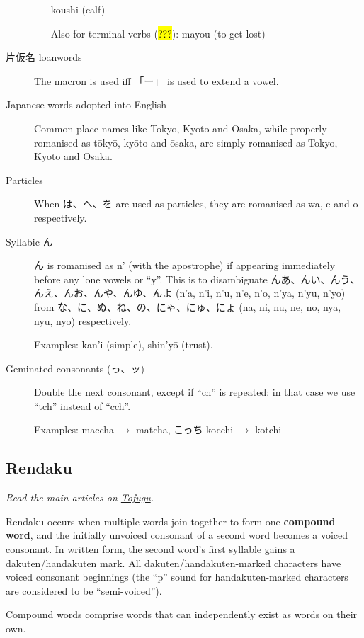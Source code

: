 \documentclass[../nihongo-gakushuu-kyouzai.tex]{subfiles}
\begin{document}
\begin{description}
\begin{itemize}
         koushi (calf)

        Also for terminal verbs (\hl{???}):  mayou (to get lost)
    \end{itemize}
    \item[片仮名 loanwords] The macron is used iff 「ー」 is used to extend a vowel.
    \item[Japanese words adopted into English] Common place names like Tokyo, Kyoto and Osaka, while properly romanised as t\=oky\=o, ky\=oto and \=osaka, are simply romanised as Tokyo, Kyoto and Osaka.
    \item[Particles] When は、へ、を are used as particles, they are romanised as wa, e and o respectively.
    \item[Syllabic ん] ん is romanised as n' (with the apostrophe) if appearing immediately before any lone vowels or ``y''. This is to disambiguate んあ、んい、んう、んえ、んお、んや、んゆ、んよ (n'a, n'i, n'u, n'e, n'o, n'ya, n'yu, n'yo) from な、に、ぬ、ね、の、にゃ、にゅ、にょ (na, ni, nu, ne, no, nya, nyu, nyo) respectively.

    Examples:  kan'i (simple),  shin'y\=o (trust).
    \item[Geminated consonants (っ、ッ)] Double the next consonant, except if ``ch'' is repeated: in that case we use ``tch'' instead of ``cch''.

    Examples:  maccha $\to$ matcha, こっち kocchi $\to$ kotchi
\end{description}


\subsection{Rendaku} \label{sec:rendaku}
\emph{Read the main articles on \href{https://www.tofugu.com/japanese/rendaku/}{Tofugu}.}

Rendaku occurs when multiple words join together to form one \textbf{compound word}, and the initially unvoiced consonant of a second word becomes a voiced consonant. In written form, the second word's first syllable gains a dakuten/handakuten mark. All dakuten/handakuten-marked characters have voiced consonant beginnings (the ``p'' sound for handakuten-marked characters are considered to be ``semi-voiced'').

Compound words comprise words that can independently exist as words on their own.
\end{document}

